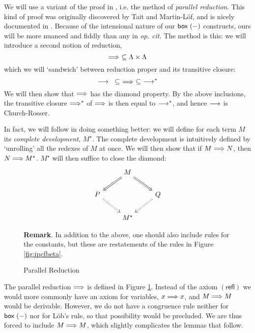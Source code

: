 We will use a variant of the proof in \cite{Kavvos2017b}, i.e.
the method of \emph{parallel reduction}. This kind of proof was
originally discovered by Tait and Martin-L\"of, and is nicely
documented in \cite{Takahashi1995}. Because of the intensional
nature of our $\mathsf{box\;}(-)$ constructs, ours will be more nuanced
and fiddly than any in \emph{op. cit.} The method is this: we will
introduce a second notion of reduction, \[
  \mathrel{\Longrightarrow}\ \subseteq \Lambda \times \Lambda
\] which we will `sandwich' between reduction proper and its
transitive closure: \[
  \red{}\ \subseteq\ \redp\ \subseteq\ \redt
\] We will then show that $\mathrel{\Longrightarrow}$ has the diamond property. By the
above inclusions, the transitive closure $\mathrel{\Longrightarrow}^\ast$ of $\mathrel{\Longrightarrow}$
is then equal to $\mathrel{\longrightarrow^\ast}$, and hence $\mathrel{\longrightarrow}$ is Church-Rosser.

In fact, we will follow \cite{Takahashi1995} in doing something
better: we will define for each term $M$ its \emph{complete
development}, $M^\star$. The complete development is intuitively
defined by `unrolling' all the redexes of $M$ at once. We will
then show that if $M \mathrel{\Longrightarrow} N$, then $N \mathrel{\Longrightarrow} M^\star$. $M^\star$
will then suffice to close the diamond: \[
  \begin{tikzcd}
    & M
	\arrow[dr, Rightarrow]
	\arrow[dl, Rightarrow]
    &  \\
    P
      \arrow[dr, Rightarrow, dotted]
    & 
    & Q 
      \arrow[dl, Rightarrow, dotted] \\
    & M^\star
  \end{tikzcd}
\]

\begin{figure}
  \centering
  \caption{Parallel Reduction}
    

    \begin{minipage}{0.85\textwidth}
      \textbf{Remark}. In addition to the above, one should also include rules for the constants,
      but these are restatements of the rules in Figure \ref{fig:ipcfbeta}.
    \end{minipage}
  \label{fig:parallel}
\end{figure}

The parallel reduction $\mathrel{\Longrightarrow}$ is defined in Figure
\ref{fig:parallel}. Instead of the axiom $(\textsf{refl})$ we
would more commonly have an axiom for variables, $x \mathrel{\Longrightarrow}{} x$,
and $M \mathrel{\Longrightarrow}{} M$ would be derivable. However, we do not have a
congruence rule neither for $\mathsf{box\;}(-)$ nor for L\"ob's rule, so
that possibility would be precluded. We are thus forced to include
$M \mathrel{\Longrightarrow}{} M$, which slightly complicates the lemmas that follow.

